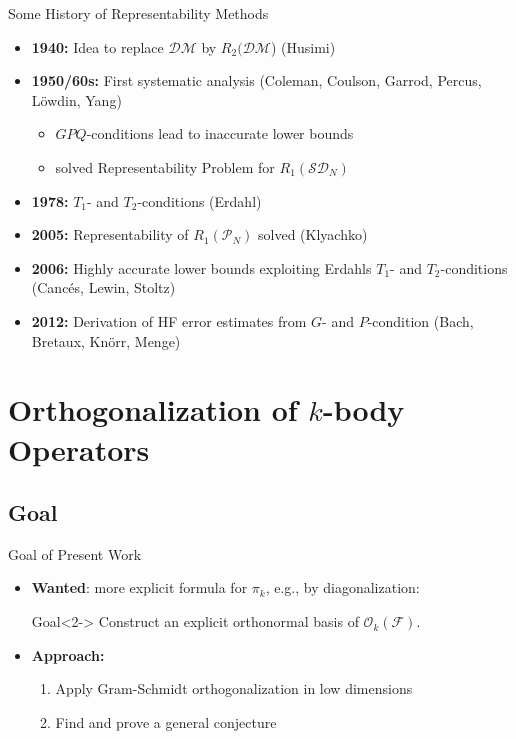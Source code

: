 \documentclass{beamer}
\newcommand{\DensityMatrices}{\mathcal{DM}}
\newcommand{\kbOp}[1][k]{{\ensuremath{\mathcal{O}_{#1}(\mathcal{F})}}}
\begin{document}
\begin{frame}{Some History of Representability Methods}
    \begin{itemize}
        \item \textbf{1940:} Idea to replace $\DensityMatrices$ by $R_2(\DensityMatrices$) (Husimi)
        \item \textbf{1950/60s:} First systematic analysis (Coleman, Coulson, Garrod, Percus, Löwdin, Yang)
        \begin{itemize}
            \item $GPQ$-conditions lead to inaccurate lower bounds
            \item solved Representability Problem for $R_1(\mathcal{SD}_N)$
        \end{itemize}
        \item \textbf{1978:} $T_1$- and $T_2$-conditions (Erdahl)
        \item \textbf{2005:} Representability of $R_1(\mathcal{P}_N)$ solved  (Klyachko)
        \item \textbf{2006:} Highly accurate lower bounds exploiting Erdahls $T_1$- and $T_2$-conditions (Cancés, Lewin, Stoltz)
        \item \textbf{2012:} Derivation of HF error estimates from $G$- and $P$-condition (Bach, Bretaux, Knörr, Menge)
    \end{itemize}
\end{frame}

\section{Orthogonalization of $k$-body Operators}\frame{\sectionpage}
\subsection{Goal}
\begin{frame}{Goal of Present Work}

\begin{itemize}
    \item \textbf{Wanted}: more explicit formula for $\pi_k$, e.g., by diagonalization:
    \begin{block}{Goal}<2->
        Construct an explicit orthonormal basis of $\kbOp$.
    \end{block}
    \item<3-> \textbf{Approach:}
    \begin{enumerate}
        \item Apply Gram-Schmidt orthogonalization in low dimensions
        \item Find and prove a general conjecture
    \end{enumerate}
\end{itemize}
\end{frame}
\end{document}
